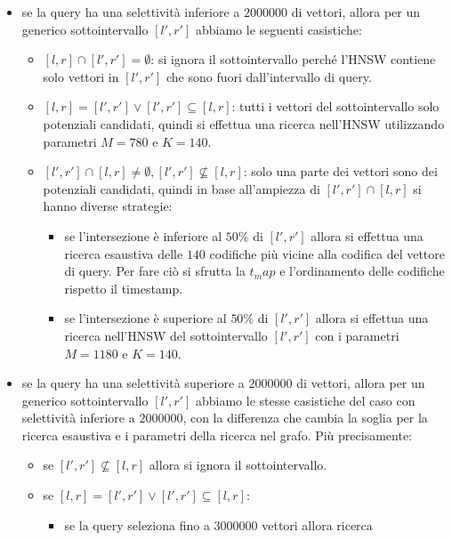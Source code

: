\begin{itemize}
    \item se la query ha una selettività inferiore a $2000000$ di vettori, allora 
    per un generico sottointervallo $[l',r']$ abbiamo le seguenti casistiche:
    \begin{itemize}
        \item $[l,r]\cap [l',r'] = \emptyset$: si ignora il sottointervallo perché 
        l'HNSW contiene solo vettori in $[l',r']$ che sono fuori dall'intervallo 
        di query.
        \item $[l,r] = [l',r'] \lor  [l',r'] \subseteq [l,r]$: tutti i vettori 
        del sottointervallo solo potenziali candidati, quindi si effettua una ricerca nell'HNSW
        utilizzando parametri $M=780$ e $K=140$.
        \item $[l',r'] \cap [l,r] \ne \emptyset, [l',r'] \not \subseteq [l,r]$: 
        solo una parte dei vettori sono dei potenziali candidati, quindi in base 
        all'ampiezza di $[l',r'] \cap [l,r]$ si hanno diverse strategie:
        \begin{itemize}
            \item se l'intersezione è inferiore al $50\%$ di $[l',r']$ allora si effettua una 
            ricerca esaustiva delle $140$ codifiche più vicine alla codifica del 
            vettore di query. Per fare ciò si sfrutta la $t_map$ e 
            l'ordinamento delle codifiche rispetto il timestamp.
            \item se l'intersezione è superiore al $50\%$ di $[l',r']$ allora si effettua una 
            ricerca nell'HNSW del sottointervallo $[l',r']$ con i parametri $M=1180$ e $K=140$.
        \end{itemize}
    \end{itemize}
    \item se la query ha una selettività superiore a $2000000$ di vettori, allora 
    per un generico sottointervallo $[l',r']$ abbiamo le stesse casistiche 
    del caso con selettività inferiore a $2000000$, con la differenza che cambia
    la soglia per la ricerca esaustiva e i parametri della ricerca nel grafo. Più 
    precisamente:
    \begin{itemize}
        \item se $[l',r'] \not \subseteq [l,r]$ allora si ignora il sottointervallo.
        \item se $[l,r] = [l',r'] \lor  [l',r'] \subseteq [l,r]$:
        \begin{itemize}
            \item se la query seleziona fino a $3000000$ vettori allora ricerca 

\end{itemize}
\end{itemize}
\end{itemize}
